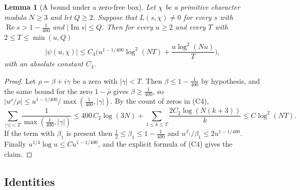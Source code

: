 \documentclass[11pt,letterpaper]{article}
\newtheorem{lemma}[theorem]{Lemma}
\numberwithin{equation}{section}
\begin{document}
\begin{lemma}[A bound under a zero-free box]\label{boxpsi}
Let $\chi$ be a primitive character modulo $N\ge3$ and let $Q\ge2$. Suppose that $L(s,\chi)\ne0$ for every $s$ with $\operatorname{Re}s>1-\tfrac1{400}$ and $|\operatorname{Im}s|\le Q$. Then for every $u\ge2$ and every $T$ with $2\le T\le\min(u,Q)$
\[
|\psi(u,\chi)|\le C_4\Big(u^{1-1/400}\log^2(NT)+\frac{u\log^2(Nu)}T\Big),
\]
with an absolute constant $C_4$.
\end{lemma}
\begin{proof}
Let $\rho=\beta+i\gamma$ be a zero with $|\gamma|<T$. Then $\beta\le1-\tfrac1{400}$ by hypothesis, and the same bound for the zero $1-\bar\rho$ gives $\beta\ge\tfrac1{400}$, so $|u^\rho/\rho|\le u^{1-1/400}/\max(\tfrac1{400},|\gamma|)$. By the count of zeros in (C4),
\[
\sum_{|\gamma|<T}\frac1{\max(\frac1{400},|\gamma|)}\le400\,C_2\log(3N)+\sum_{1\le k\le T}\frac{2C_2\log(N(k+3))}{k}\le C\log^2(NT).
\]
If the term with $\beta_1$ is present then $\tfrac12\le\beta_1\le1-\tfrac1{400}$ and $u^{\beta_1}/\beta_1\le2u^{1-1/400}$. Finally $u^{1/4}\log u\le Cu^{1-1/400}$, and the explicit formula of (C4) gives the claim.
\end{proof}

\subsection{Identities}
\end{document}

